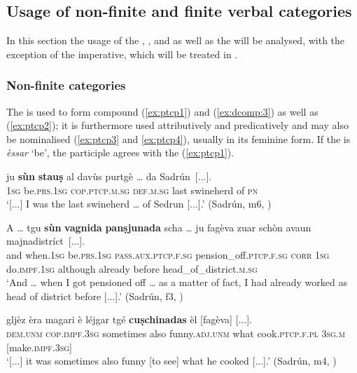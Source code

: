 \subsection{Usage of non-finite and finite verbal categories}\label{sec:4.1.2}
In this section the usage of the  , , and  as well as the  will be analysed, with the exception of the imperative, which will be treated in .

\subsubsection{Non-finite categories}\label{sec:4.1.2.1}

 \label{sec:4.1.2.1.1}
The  is used to form compound (\ref{ex:ptcp1}) and  (\ref{ex:dcomp:3}) as well as  (\ref{ex:ptcp2}); it is furthermore used attributively and predicatively and may also be nominalised (\ref{ex:ptcp3} and \ref{ex:ptcp4}), usually in its feminine form. If the  is \textit{èssar} `be', the participle agrees with the  (\ref{ex:ptcp1}).

\ea
\label{ex:ptcp1}
\gll    [...] ju \textbf{sùn} \textbf{stauṣ} al davùs purtgè … da Sadrún~[...].\\
{}  \textsc{1sg} be.\textsc{prs.1sg} \textsc{cop.ptcp.m.sg} \textsc{def.m.sg} last swineherd {} of \textsc{pn} \\
\glt `[...] I was the last swineherd … of Sedrun [...].' (Sadrún, m6, )
\z

\ea\label{ex:ptcp2}
\gll  A … tgu \textbf{sùn} \textbf{vagnida} \textbf{panṣjunada} scha … ju fagèva zuar schòn avaun majnadistríct~[...].\\
and {} when.\textsc{1sg} be.\textsc{prs.1sg} \textsc{pass.aux.ptcp.f.sg} pension\_off.\textsc{ptcp.f.sg} \textsc{corr} {} \textsc{1sg} do.\textsc{impf.1sg} although already before head\_of\_district.\textsc{m.sg}\\
\glt `And … when I got pensioned off … as a matter of fact, I had already worked as head of district before [...].' (Sadrún, f3, )
\z

\ea\label{ex:ptcp3}
\gll [...] gljèz èra magari è léjgar  tgé \textbf{cuṣchinadas} èl [fagèva] [...].\\
{} \textsc{dem.unm} \textsc{cop.impf.3sg} sometimes also funny.\textsc{adj.unm} what cook.\textsc{ptcp.f.pl}  \textsc{3sg.m} [make.\textsc{impf.3sg}] \\
\glt `[...] it was sometimes also funny [to see] what he cooked [...].' (Sadrún, m4, )
\z

